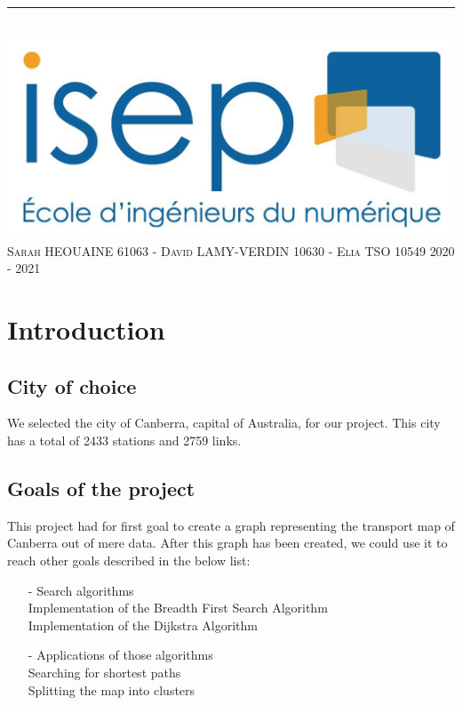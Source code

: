 \documentclass{article}
\begin{document}
\begin{titlepage}
\begin{center}
		\rule{16cm}{0.4pt} \\
		\vspace{5mm}
		\includegraphics[scale=0.20]{assets/logoISEP} \\
		\textsc{\large Sarah HEOUAINE 61063 - David LAMY-VERDIN 10630 - Elia TSO 10549}
		\medbreak
		\textsc{\large 2020 - 2021}
	\end{center}
\end{titlepage}

\renewcommand{\contentsname}{Table of contents}
\tableofcontents
\cleardoublepage

\section{Introduction}

\subsection{City of choice}

	We selected the city of Canberra, capital of Australia, for our project. This city has a total of 2433 stations and 2759 links.
	
\subsection{Goals of the project}

	This project had for first goal to create a graph representing the transport map of Canberra out of mere data. After this graph has been created, we could use it to reach other goals described in the below list:
	
\begin{itemize}
\item[-] Search algorithms \\
Implementation of the Breadth First Search Algorithm \\
Implementation of the Dijkstra Algorithm
\medbreak
\item[-] Applications of those algorithms \\
Searching for shortest paths \\
Splitting the map into clusters
\end{itemize}
\end{document}
